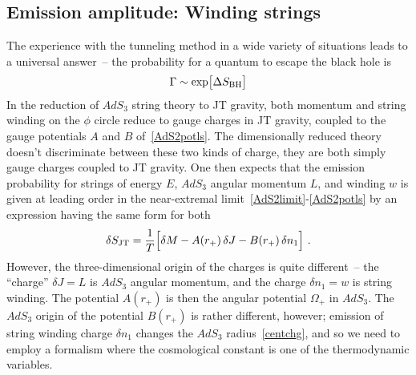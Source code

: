 \documentclass[11pt]{article}
\def\BH{{\rm BH}}
\numberwithin{equation}{section}
\def\exp{{\rm exp}}
\begin{document}

\subsection{Emission amplitude: Winding strings}
\label{sec:stramplitude}


The experience with the tunneling method in a wide variety of situations leads to a universal answer~-- the probability for a quantum to escape the black hole is 
\begin{align}
\begin{split}
\label{emitprob}
\Gamma \sim \exp\big[ {\Delta S_\BH} \big] 
\end{split}
\end{align}
In the reduction of $AdS_3$ string theory to JT gravity, both momentum and string winding on the $\phi$ circle reduce to gauge charges in JT gravity, coupled to the gauge potentials $A$ and $B$ of~\eqref{AdS2potls}.  The dimensionally reduced theory doesn't discriminate between these two kinds of charge, they are both simply gauge charges coupled to JT gravity.  One then expects that the emission probability for strings of energy $E $, $AdS_3$ angular momentum $L $, and winding $w$ is given at leading order in the near-extremal limit~\eqref{AdS2limit}-\eqref{AdS2potls} by an expression having the same form for both
\begin{align}
\begin{split}
\delta S_{\rm JT} = \frac 1T\Big[ \delta M - A(r_+) \,\delta J  - B(r_+) \,\delta n_1 \Big]  ~.
\end{split}
\end{align}
However, the three-dimensional origin of the charges is quite different~-- the ``charge'' $\delta J=L$ is $AdS_3$ angular momentum, and the charge $\delta n_1=w$ is string winding.  The potential $A(r_+)$ is then the angular potential $\Omega_+$ in $AdS_3$.  The $AdS_3$ origin of the potential $B(r_+)$ is rather different, however;
emission of string winding charge $\delta n_1$ changes the $AdS_3$ radius~\eqref{centchg}, and so we need to employ a formalism where the cosmological constant is one of the thermodynamic variables.
\end{document}
